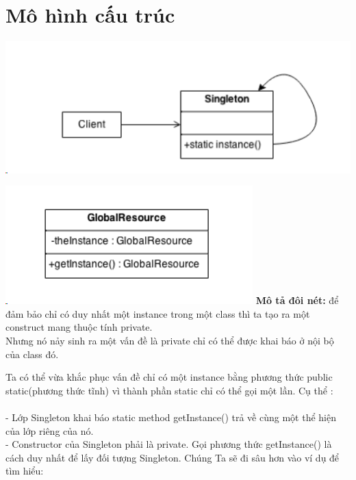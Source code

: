 \section{Mô hình cấu trúc}
\includegraphics{GALLEYS/images/chapter1/diagram01}
\begin{multicols}{2}
\vspace{-20pt}
\includegraphics{GALLEYS/images/chapter1/diagram2}
\textbf{Mô tả đôi nét:} để đảm bảo chỉ có duy nhất một instance trong một class thì ta tạo ra một construct mang thuộc tính private.\\
Nhưng nó nảy sinh ra một vấn đề là private chỉ có thể được khai báo ở nội bộ của class đó.
\end{multicols}
Ta có thể vừa khắc phục vấn đề chỉ có một instance bằng phương thức public static(phương thức tĩnh) vì thành phần static chỉ có thể gọi một lần. Cụ thể :\\\\
- Lớp Singleton khai báo static method getInstance() trả về cùng một thể hiện của lớp riêng của nó.\\
- Constructor của Singleton phải là private. Gọi phương thức getInstance() là cách duy nhất để lấy đối tượng Singleton.
Chúng Ta sẽ đi sâu hơn vào ví dụ để tìm hiểu:\\
